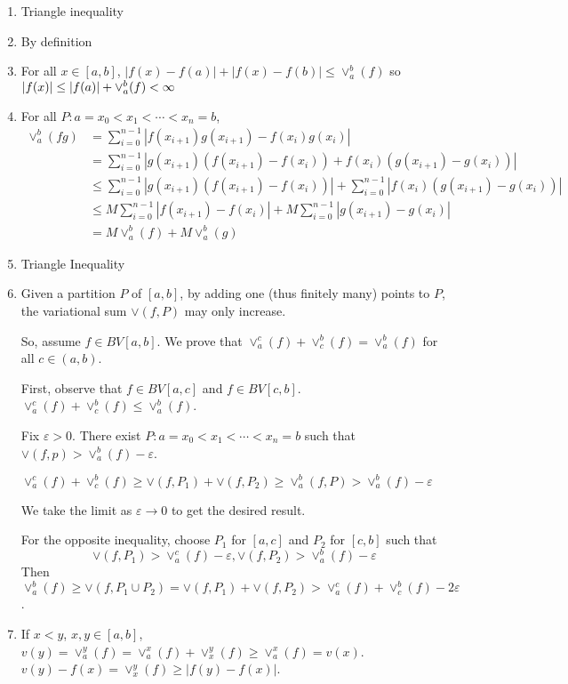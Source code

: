 \documentclass[x11names,reqno,14pt]{extarticle}
\begin{document}
\begin{enumerate}

\item Triangle inequality

\item By definition 

\item For all $x \in [a, b]$, $|f(x) - f(a)| + |f(x) - f(b)| \leq \vee_a^b(f)$ so $|f(x)| \leq |f(a)| + \vee_a^b(f)<\infty$

\item For all $P:a=x_0 < x_1 < \cdots < x_n = b$, 
\begin{align*}
\vee_a^b(fg) & = \sum_{i=0}^{n - 1}|f(x_{i + 1})g(x_{i + 1}) - f(x_i)g(x_i)| \\ 
& = \sum_{i=0}^{n - 1}|g(x_{i + 1})(f(x_{i + 1}) - f(x_i)) + f(x_i)(g(x_{i + 1}) - g(x_i))| \\
& \leq \sum_{i=0}^{n - 1}|g(x_{i + 1})(f(x_{i + 1}) - f(x_i))| + \sum_{i=0}^{n - 1}|f(x_i)(g(x_{i + 1}) - g(x_i))| \\
& \leq M\sum_{i=0}^{n - 1}|f(x_{i + 1}) - f(x_i)| + M \sum_{i=0}^{n - 1}|g(x_{i + 1}) - g(x_i)| \\
& = M\vee_a^b(f) + M\vee_a^b(g)
\end{align*}

\item Triangle Inequality

\item Given a partition $P$ of $[a, b]$, by adding one (thus finitely many) points to $P$, the variational sum $\vee(f, P)$ may only increase. 

So, assume $f\in BV[a, b]$. We prove that $\vee_a^c(f) + \vee_c^b(f) = \vee_a^b(f)$ for all $c \in (a, b)$. 

First, observe that $f\in BV[a, c]$ and $f \in BV[c, b]$. $\vee_a^c(f) + \vee_c^b(f) \leq \vee_a^b(f)$. 

Fix $\varepsilon>0$. There exist $P:a = x_0 < x_1 < \cdots < x_n = b$ such that $\vee(f, p) > \vee_a^b(f)-\varepsilon$. 

$\vee_a^c(f) + \vee_c^b(f) \geq \vee(f, P_1) + \vee(f, P_2) \geq \vee_a^b(f, P) > \vee_a^b(f)-\varepsilon$

We take the limit as $\varepsilon\to0$ to get the desired result. 

For the opposite inequality, choose $P_1$ for $[a, c]$ and $P_2$ for $[c, b]$ such that 
\[
\vee(f, P_1) > \vee_a^c(f)-\varepsilon, \vee(f, P_2) > \vee_a^b(f)-\varepsilon
\]
Then $\vee_a^b(f) \geq \vee(f, P_1 \cup P_2) = \vee(f, P_1) + \vee(f, P_2) > \vee_a^c(f) + \vee_c^b(f) - 2\varepsilon$. 

\item If $x < y$, $x, y \in [a, b]$, $v(y) = \vee_a^y(f) = \vee_a^x(f) + \vee_x^y(f) \geq \vee_a^x(f) = v(x)$. $v(y) - f(x) = \vee_x^y(f) \geq |f(y) - f(x)|$.

\end{enumerate}
\end{document}
